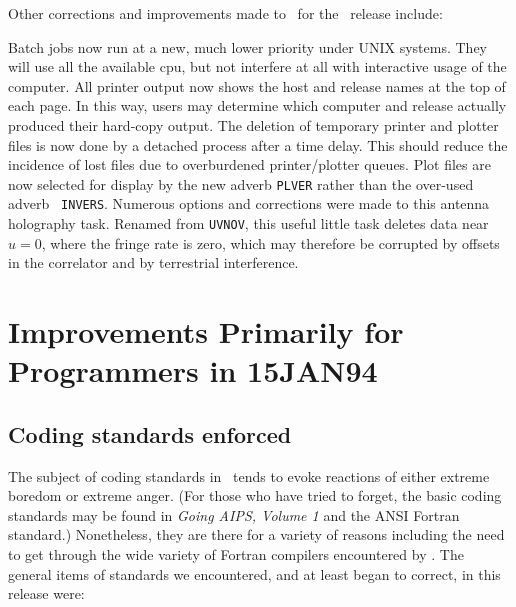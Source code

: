 Other corrections and improvements made to \AIPS\ for the
\RELEASENAME\ release include:
\begin{description}
 Batch jobs now run at a new, much lower priority
   under UNIX systems.  They will use all the available cpu, but not
   interfere at all with interactive usage of the computer.
 All printer output now shows the host and
   release names at the top of each page.  In this way, users may
   determine which computer and release actually produced their
   hard-copy output.
 The deletion of temporary printer and
   plotter files is now done by a detached process after a time
   delay.  This should reduce the incidence of lost files due to
   overburdened printer/plotter queues.
 Plot files are now selected for display by the
   new adverb {\tt PLVER} rather than the over-used adverb \hbox{{\tt
   INVERS}}.
 Numerous options and corrections were made to this
   antenna holography task.
 Renamed from {\tt UVNOV}, this useful little task
   deletes data near $u = 0$, where the fringe rate is zero, which may
   therefore be corrupted by offsets in the correlator and by
   terrestrial interference.
\end{description}

\section{Improvements Primarily for Programmers in 15JAN94}

\subsection{Coding standards enforced}

The subject of coding standards in \AIPS\ tends to evoke reactions of
either extreme boredom or extreme anger.  (For those who have tried to
forget, the basic coding standards  may be found in {\it Going AIPS,
Volume 1} and the ANSI Fortran standard.)  Nonetheless, they are there
for a variety of reasons including the need to get through the wide
variety of Fortran compilers encountered by \AIPS.  The general items
of standards we encountered, and at least began to correct, in this
release were:


